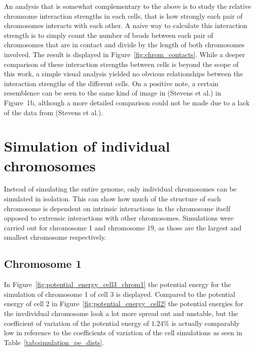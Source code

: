 An analysis that is somewhat complementary to the above is to study the relative chromsome interaction strengths in each cells, that is how strongly each pair of chromosomes interacts with each other. A naive way to calculate this interaction strength is to simply count the number of beads between each pair of chromosomes that are in contact and divide by the length of both chromosomes involved. The result is displayed in Figure~\ref{fig:chrom_contacts}. While a deeper comparison of these interaction strengths between cells is beyond the scope of this work, a simple visual analysis yielded no obvious relationships between the interaction strengths of the different cells. On a positive note, a certain resemblence can be seen to the same kind of image in (Stevens et al.\cite{stevens_3d_2017}) in Figure~1b, although a more detailed comparison could not be made due to a lack of the data from (Stevens et al.).


\section{Simulation of individual chromosomes} %
\label{sec:simulation_of_individual_chromosomes}

Instead of simulating the entire genome, only individual chromosomes can be simulated in isolation. This can show how much of the structure of each chromosome is dependent on intrinsic interactions in the chromosome itself opposed to extrensic interactions with other chromosomes. Simulations were carried out for chromosome 1 and chromosome 19, as those are the largest and smallest chromosome respectively.

\subsection{Chromosome 1} %
\label{ssec:chromosome_1}

In Figure~\ref{fig:potential_energy_cell3_chrom1} the potential energy for the simulation of chromosome 1 of cell 3 is displayed. Compared to the potential energy of cell 2 in Figure~\ref{fig:potential_energy_cell2} the potential energies for the invdividual chromosome look a lot more spread out and unstable, but the coefficient of variation of the potential energy of \(1.24 \%\) is actually comparably low in reference to the coefficients of variation of the cell simulations as seen in Table~\ref{tab:simulation_pe_dists}. 

